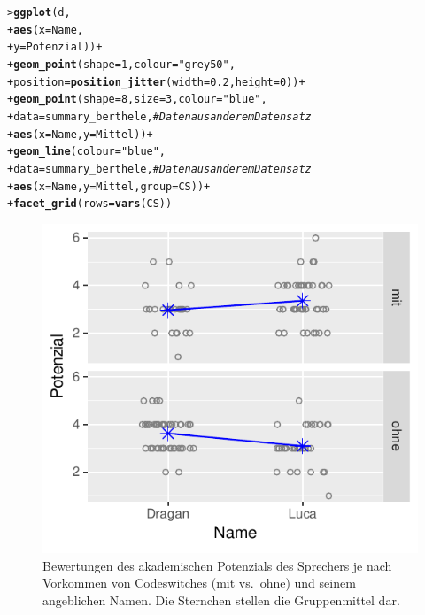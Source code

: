 \documentclass[oneside, 10pt]{book}\usepackage[]{graphicx}\usepackage[]{xcolor}
\makeatletter
\newcommand{\hlnum}[1]{\textcolor[rgb]{0.686,0.059,0.569}{#1}}%
\newcommand{\hlstr}[1]{\textcolor[rgb]{0.192,0.494,0.8}{#1}}%
\newcommand{\hlcom}[1]{\textcolor[rgb]{0.678,0.584,0.686}{\textit{#1}}}%
\newcommand{\hlopt}[1]{\textcolor[rgb]{0,0,0}{#1}}%
\newcommand{\hlstd}[1]{\textcolor[rgb]{0.345,0.345,0.345}{#1}}%
\newcommand{\hlkwc}[1]{\textcolor[rgb]{0.333,0.667,0.333}{#1}}%
\newcommand{\hlkwd}[1]{\textcolor[rgb]{0.737,0.353,0.396}{\textbf{#1}}}%
\newenvironment{kframe}{%
 \def\at@end@of@kframe{}%
 \ifinner\ifhmode%
  \def\at@end@of@kframe{\end{minipage}}%
  \begin{minipage}{\columnwidth}%
 \fi\fi%
 \def\FrameCommand##1{\hskip\@totalleftmargin \hskip-\fboxsep
 \colorbox{shadecolor}{##1}\hskip-\fboxsep
     \hskip-\linewidth \hskip-\@totalleftmargin \hskip\columnwidth}%
 \MakeFramed {\advance\hsize-\width
   \@totalleftmargin\z@ \linewidth\hsize
   \@setminipage}}%
 {\par\unskip\endMakeFramed%
 \at@end@of@kframe}
\newenvironment{knitrout}{}{} %
\makeatother
\begin{document}
\begin{knitrout}
\color{fgcolor}\begin{kframe}
\begin{alltt}
\hlstd{> }\hlkwd{ggplot}\hlstd{(d,}
\hlstd{+ }       \hlkwd{aes}\hlstd{(}\hlkwc{x} \hlstd{= Name,}
\hlstd{+ }           \hlkwc{y} \hlstd{= Potenzial))} \hlopt{+}
\hlstd{+ }  \hlkwd{geom_point}\hlstd{(}\hlkwc{shape} \hlstd{=} \hlnum{1}\hlstd{,} \hlkwc{colour} \hlstd{=} \hlstr{"grey50"}\hlstd{,}
\hlstd{+ }             \hlkwc{position} \hlstd{=} \hlkwd{position_jitter}\hlstd{(}\hlkwc{width} \hlstd{=} \hlnum{0.2}\hlstd{,} \hlkwc{height} \hlstd{=} \hlnum{0}\hlstd{))} \hlopt{+}
\hlstd{+ }  \hlkwd{geom_point}\hlstd{(}\hlkwc{shape} \hlstd{=} \hlnum{8}\hlstd{,} \hlkwc{size} \hlstd{=} \hlnum{3}\hlstd{,} \hlkwc{colour} \hlstd{=} \hlstr{"blue"}\hlstd{,}
\hlstd{+ }             \hlkwc{data} \hlstd{= summary_berthele,}     \hlcom{# Daten aus anderem Datensatz}
\hlstd{+ }             \hlkwd{aes}\hlstd{(}\hlkwc{x} \hlstd{= Name,} \hlkwc{y} \hlstd{= Mittel))} \hlopt{+}
\hlstd{+ }  \hlkwd{geom_line}\hlstd{(}\hlkwc{colour} \hlstd{=} \hlstr{"blue"}\hlstd{,}
\hlstd{+ }            \hlkwc{data} \hlstd{= summary_berthele,}      \hlcom{# Daten aus anderem Datensatz}
\hlstd{+ }            \hlkwd{aes}\hlstd{(}\hlkwc{x} \hlstd{= Name,} \hlkwc{y} \hlstd{= Mittel,} \hlkwc{group} \hlstd{= CS))} \hlopt{+}
\hlstd{+ }  \hlkwd{facet_grid}\hlstd{(}\hlkwc{rows} \hlstd{=} \hlkwd{vars}\hlstd{(CS))}
\end{alltt}
\end{kframe}\begin{figure}[tp]

{\centering \includegraphics[width=.5\textwidth]{figs/unnamed-chunk-275-1} 

}

\caption{Bewertungen des akademischen Potenzials des Sprechers je nach Vorkommen von Codeswitches (mit vs.\ ohne) und seinem angeblichen Namen. Die Sternchen stellen die Gruppenmittel dar.\label{fig:berthelebp3}}\label{fig:unnamed-chunk-275}
\end{figure}

\end{knitrout}
\end{document}
